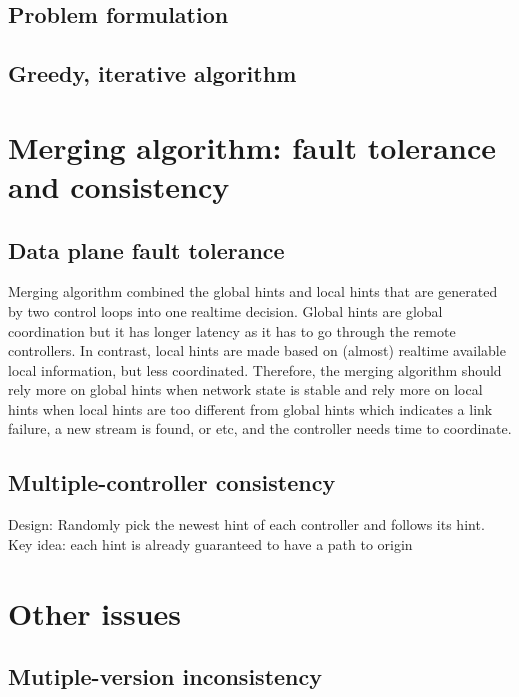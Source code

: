 \subsection{Problem formulation}


\subsection{Greedy, iterative algorithm}





\section{Merging algorithm: fault tolerance and consistency}


\subsection{Data plane fault tolerance}
Merging algorithm combined the global hints and local hints that are generated by two control loops into one realtime decision. Global hints are global coordination but it has longer latency as it has to go through the remote controllers. In contrast, local hints are made based on (almost) realtime available local information, but less coordinated. Therefore, the merging algorithm should rely more on global hints when network state is stable and rely more on local hints when local hints are too different from global hints which indicates a link failure, a new stream is found, or etc, and the controller needs time to coordinate.

\subsection{Multiple-controller consistency}
Design: Randomly pick the newest hint of each controller and follows its hint.  Key idea: each hint is already guaranteed to have a path to origin




\section{Other issues}

\subsection{Mutiple-version inconsistency}




